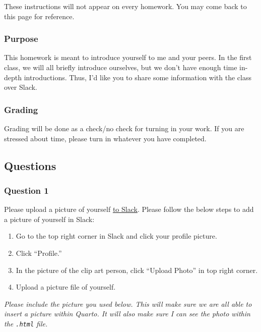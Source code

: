 \documentclass[
  letterpaper,
  DIV=11,
  numbers=noendperiod]{scrartcl}
\providecommand{\tightlist}{%
  \setlength{\itemsep}{0pt}\setlength{\parskip}{0pt}}\usepackage{longtable,booktabs,array}
\begin{document}
These instructions will not appear on every homework. You may come back
to this page for reference.

\hypertarget{purpose}{%
\subsubsection{Purpose}\label{purpose}}

This homework is meant to introduce yourself to me and your peers. In
the first class, we will all briefly introduce ourselves, but we don't
have enough time in-depth introductions. Thus, I'd like you to share
some information with the class over Slack.

\hypertarget{grading}{%
\subsubsection{Grading}\label{grading}}

Grading will be done as a check/no check for turning in your work. If
you are stressed about time, please turn in whatever you have completed.

\hypertarget{questions}{%
\subsection{Questions}\label{questions}}

\hypertarget{question-1}{%
\subsubsection{Question 1}\label{question-1}}

Please upload a picture of yourself
\href{https://join.slack.com/t/bsta512613w2024/shared_invite/zt-29g7biioz-XhPs~tj8xwL1GajEw9YlTg}{to
Slack}. Please follow the below steps to add a picture of yourself in
Slack:

\begin{enumerate}
\def\labelenumi{\arabic{enumi}.}
\tightlist
\item
  Go to the top right corner in Slack and click your profile picture.
\item
  Click ``Profile.''
\item
  In the picture of the clip art person, click ``Upload Photo'' in top
  right corner.
\item
  Upload a picture file of yourself.
\end{enumerate}

\emph{Please include the picture you used below. This will make sure we
are all able to insert a picture within Quarto. It will also make sure I
can see the photo within the \texttt{.html} file.}
\end{document}
